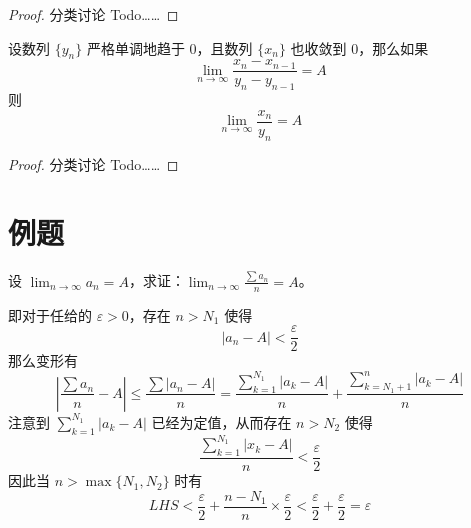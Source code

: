 \begin{proof}
	分类讨论 Todo……
\end{proof}

\begin{theorem}
	设数列 $\{y_n\}$ 严格单调地趋于 $0$，且数列 $\{x_n\}$ 也收敛到 $0$，那么如果
	$$\lim_{n\to \infty}\frac{x_n-x_{n-1}}{y_n-y_{n-1}}=A$$
	则
	$$\lim_{n\to \infty} \frac{x_n}{y_n} = A$$
\end{theorem}

\begin{proof}
	分类讨论 Todo……
\end{proof}

\section{例题}

\begin{problem}
	设 $\displaystyle\lim_{n\to\infty}a_n=A$，求证：$\displaystyle\lim_{n\to\infty}\frac{\sum a_n}{n}=A$。
\end{problem}

\begin{solution}
	即对于任给的 $\varepsilon>0$，存在 $n>N_1$ 使得
	$$|a_n-A|<\dfrac{\varepsilon}{2}$$
	那么变形有
	$$\left|\frac{\sum a_n}{n}-A\right| \leqslant \frac{\sum |a_n-A|}{n} = \frac{\sum_{k=1}^{N_1} |a_k-A|}{n} + \frac{\sum_{k=N_1+1}^{n} |a_k-A|}{n}$$
	注意到 $\sum_{k=1}^{N_1} |a_k-A|$ 已经为定值，从而存在 $n>N_2$ 使得
	$$\frac{\sum_{k=1}^{N_1}|x_k-A|}{n}<\frac{\varepsilon}{2}$$
	因此当 $n>\max\{N_1,N_2\}$ 时有
	$$LHS < \frac{\varepsilon}{2}+\frac{n-N_1}{n}\times \frac{\varepsilon}{2} < \frac{\varepsilon}{2}+\frac{\varepsilon}{2} = \varepsilon$$
\end{solution}